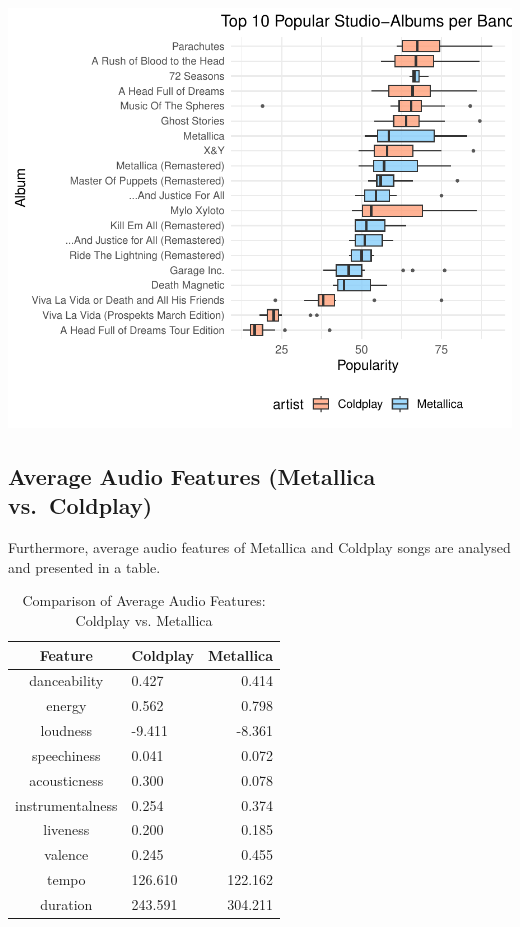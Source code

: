 \documentclass[11pt,preprint]{elsarticle}
\numberwithin{equation}{section}
\numberwithin{figure}{section}
\numberwithin{table}{section}
\begin{document}
\includegraphics{Task_2_files/figure-latex/unnamed-chunk-5-1.pdf}

\subsection{Average Audio Features (Metallica
vs.~Coldplay)}\label{average-audio-features-metallica-vs.-coldplay}

Furthermore, average audio features of Metallica and Coldplay songs are
analysed and presented in a table.

\begin{longtable}[t]{clr}
\caption{\label{tab:unnamed-chunk-6}Comparison of Average Audio Features: Coldplay vs. Metallica}\\
\toprule
Feature & Coldplay & Metallica\\
\midrule
danceability & 0.427 & 0.414\\
energy & 0.562 & 0.798\\
loudness & -9.411 & -8.361\\
speechiness & 0.041 & 0.072\\
acousticness & 0.300 & 0.078\\
\addlinespace
instrumentalness & 0.254 & 0.374\\
liveness & 0.200 & 0.185\\
valence & 0.245 & 0.455\\
tempo & 126.610 & 122.162\\
duration & 243.591 & 304.211\\
\bottomrule
\end{longtable}
\end{document}
